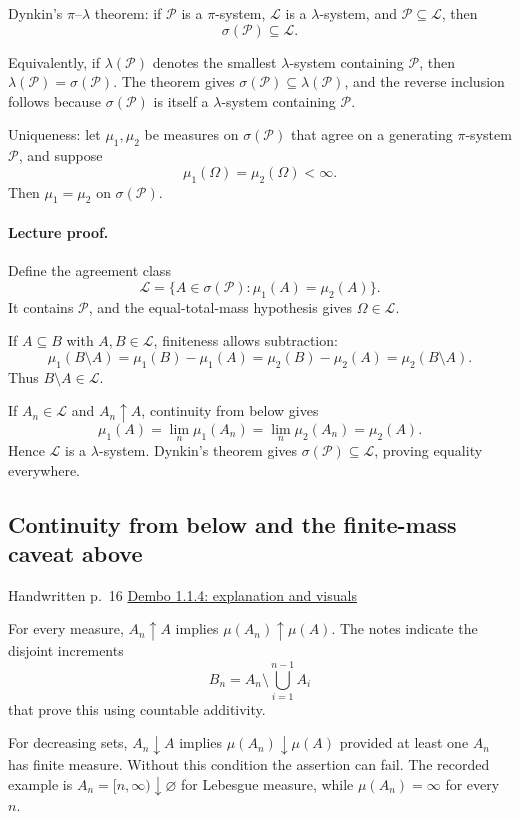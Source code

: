 \documentclass[11pt,letterpaper]{article}
\newcommand{\lecturesection}[1]{\subsection{#1}}
\begin{document}
Dynkin's $\pi$--$\lambda$ theorem: if $\mathcal P$ is a $\pi$-system, $\mathcal L$ is a $\lambda$-system, and $\mathcal P\subseteq\mathcal L$, then \[\sigma(\mathcal P)\subseteq\mathcal L.\]

Equivalently, if $\lambda(\mathcal P)$ denotes the smallest $\lambda$-system containing $\mathcal P$, then $\lambda(\mathcal P)=\sigma(\mathcal P)$. The theorem gives $\sigma(\mathcal P)\subseteq\lambda(\mathcal P)$, and the reverse inclusion follows because $\sigma(\mathcal P)$ is itself a $\lambda$-system containing $\mathcal P$.

Uniqueness: let $\mu_1,\mu_2$ be measures on $\sigma(\mathcal P)$ that agree on a generating $\pi$-system $\mathcal P$, and suppose \[\mu_1(\Omega)=\mu_2(\Omega)<\infty.\] Then $\mu_1=\mu_2$ on $\sigma(\mathcal P)$.

\paragraph{Lecture proof.}
Define the agreement class \[\mathcal L=\{A\in\sigma(\mathcal P):\mu_1(A)=\mu_2(A)\}.\] It contains $\mathcal P$, and the equal-total-mass hypothesis gives $\Omega\in\mathcal L$.

If $A\subseteq B$ with $A,B\in\mathcal L$, finiteness allows subtraction: \[\mu_1(B\setminus A)=\mu_1(B)-\mu_1(A)=\mu_2(B)-\mu_2(A)=\mu_2(B\setminus A).\] Thus $B\setminus A\in\mathcal L$.

If $A_n\in\mathcal L$ and $A_n\uparrow A$, continuity from below gives \[\mu_1(A)=\lim_n\mu_1(A_n)=\lim_n\mu_2(A_n)=\mu_2(A).\] Hence $\mathcal L$ is a $\lambda$-system. Dynkin's theorem gives $\sigma(\mathcal P)\subseteq\mathcal L$, proving equality everywhere.

\hypertarget{l2-s6}{}
\lecturesection{Continuity from below and the finite-mass caveat above}
{\small\textcolor{lectureink}{Handwritten p.\ 16} \quad \href{https://josephrbailey.com/probability/\#entry-1-1-4}{Dembo 1.1.4: explanation and visuals}}

For every measure, $A_n\uparrow A$ implies $\mu(A_n)\uparrow\mu(A)$. The notes indicate the disjoint increments \[B_n=A_n\setminus\bigcup_{i=1}^{n-1}A_i\] that prove this using countable additivity.

For decreasing sets, $A_n\downarrow A$ implies $\mu(A_n)\downarrow\mu(A)$ provided at least one $A_n$ has finite measure. Without this condition the assertion can fail. The recorded example is $A_n=[n,\infty)\downarrow\varnothing$ for Lebesgue measure, while $\mu(A_n)=\infty$ for every $n$.
\end{document}
